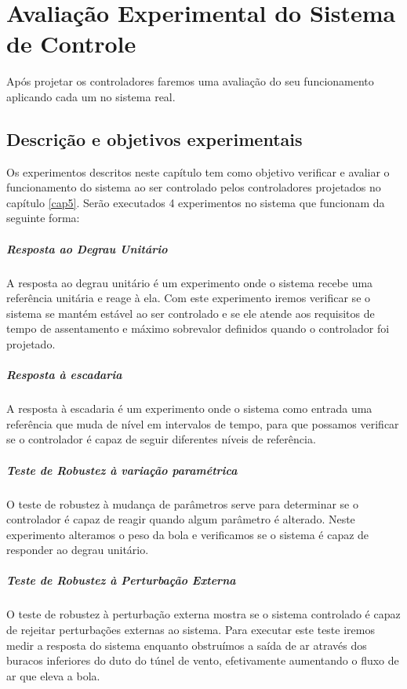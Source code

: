 \chapter{Avaliação Experimental do Sistema de Controle}\label{cap6}
Após projetar os controladores faremos uma avaliação do seu funcionamento aplicando cada um no sistema real.
\section{Descrição e objetivos experimentais}
Os experimentos descritos neste capítulo tem como objetivo verificar e avaliar o funcionamento do sistema ao ser controlado pelos controladores projetados no capítulo \ref{cap5}. Serão executados 4 experimentos no sistema que funcionam da seguinte forma:
\paragraph{Resposta ao Degrau Unitário} A resposta ao degrau unitário é um experimento onde o sistema recebe uma referência unitária e reage à ela. Com este experimento iremos verificar se o sistema se mantém estável ao ser controlado e se ele atende aos requisitos de tempo de assentamento e máximo sobrevalor definidos quando o controlador foi projetado.
\paragraph{Resposta à escadaria} A resposta à escadaria é um experimento onde o sistema como entrada uma referência que muda de nível em intervalos de tempo, para que possamos verificar se o controlador é capaz de seguir diferentes níveis de referência.

\paragraph{Teste de Robustez à variação paramétrica}

O teste de robustez à mudança de parâmetros serve para determinar se o controlador é capaz de reagir quando algum parâmetro é alterado. Neste experimento alteramos o peso da bola e verificamos se o sistema é capaz de responder ao degrau unitário.

\paragraph{Teste de Robustez à Perturbação Externa}
  O teste de robustez à perturbação externa mostra se o sistema controlado é capaz de rejeitar perturbações externas ao sistema. Para executar este teste iremos medir a resposta do sistema enquanto obstruímos a saída de ar através dos buracos inferiores do duto do túnel de vento, efetivamente aumentando o fluxo de ar que eleva a bola.

